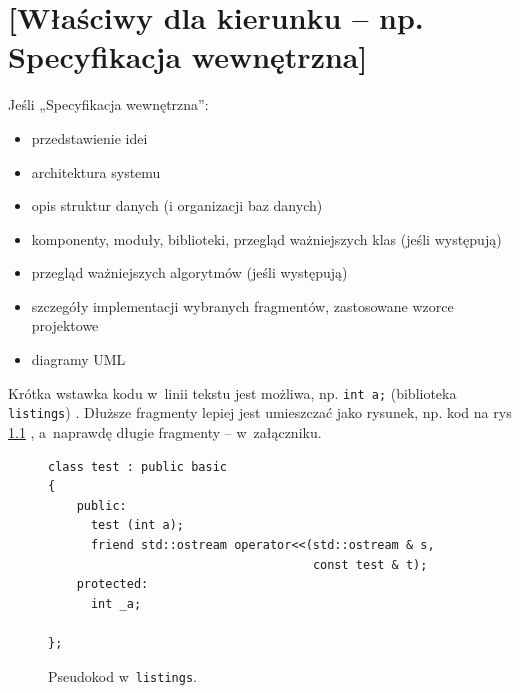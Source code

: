 \chapter{[Właściwy dla kierunku -- np. Specyfikacja wewnętrzna]}
\label{ch:05}


Jeśli „Specyfikacja wewnętrzna”:
\begin{itemize}
\item przedstawienie idei
\item architektura systemu
\item opis struktur danych (i organizacji baz danych)
\item komponenty, moduły, biblioteki, przegląd ważniejszych klas (jeśli występują)
\item przegląd ważniejszych algorytmów (jeśli występują)
\item szczegóły implementacji wybranych fragmentów, zastosowane wzorce projektowe
\item diagramy UML
\end{itemize}



Krótka wstawka kodu w~linii tekstu jest możliwa, np.  \lstinline|int a;| (biblioteka \texttt{listings})%
. 
Dłuższe fragmenty lepiej jest umieszczać jako rysunek, np. kod na rys \ref{fig:pseudokod:listings}%
, a~naprawdę długie fragmenty – w~załączniku.


\begin{figure}
\centering
\begin{lstlisting}
class test : public basic
{
    public:
      test (int a);
      friend std::ostream operator<<(std::ostream & s, 
                                     const test & t);
    protected:
      int _a;  
      
};
\end{lstlisting}
\caption{Pseudokod w~\texttt{listings}.}
\label{fig:pseudokod:listings}
\end{figure}

%      


